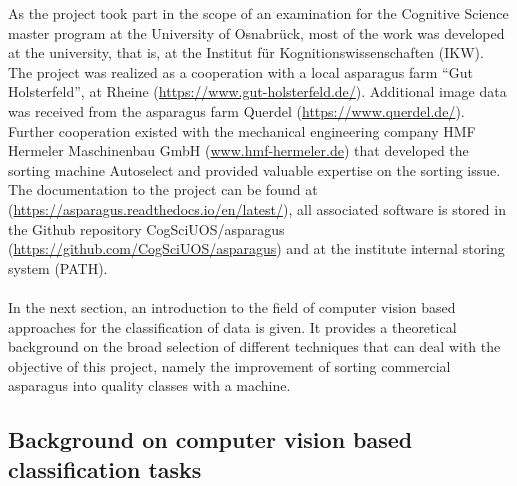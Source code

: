As the project took part in the scope of an examination for the Cognitive Science master program at the University of Osnabrück, most of the work was developed at the university, that is, at the Institut für Kognitionswissenschaften (IKW).
The project was realized as a cooperation with a local asparagus farm “Gut Holsterfeld”, at Rheine (\url{https://www.gut-holsterfeld.de/}). Additional image data was received from the asparagus farm Querdel (\url{https://www.querdel.de/}). Further cooperation existed with the mechanical engineering company HMF Hermeler Maschinenbau GmbH (\url{www.hmf-hermeler.de}) that developed the sorting machine Autoselect and provided valuable expertise on the sorting issue. \\
The documentation to the project can be found at (\url{https://asparagus.readthedocs.io/en/latest/}), all associated software is stored in the Github repository CogSciUOS/asparagus (\url{https://github.com/CogSciUOS/asparagus}) and at the institute internal storing system (PATH). \\
\\
In the next section, an introduction to the field of computer vision based approaches for the classification of data is given. It provides a theoretical background on the broad selection of different techniques that can deal with the objective of this project, namely the improvement of sorting commercial asparagus into quality classes with a machine.



\subsection{Background on computer vision based classification tasks}

